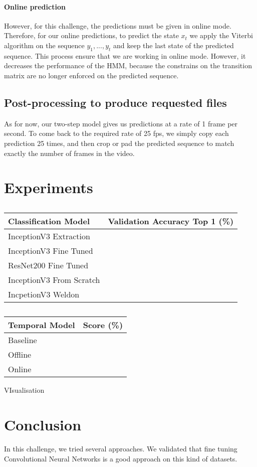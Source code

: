 \documentclass[10pt,twocolumn,letterpaper]{article}
\begin{document}
\paragraph{Online prediction} However, for this challenge, the predictions must
be given in online mode. Therefore, for our online predictions, to predict the state
$x_t$ we apply the Viterbi algorithm on the sequence $y_1,...,y_t$ and keep the
last state of the predicted sequence. This process ensure that we are working in online
mode. However, it decreases the performance of the HMM, because the constrains on the transition
matrix are no longer enforced on the predicted sequence.

\subsection{Post-processing to produce requested files}

As for now, our two-step model gives us predictions at a rate of 1 frame per second. To come
back to the required rate of 25 fps, we simply copy each prediction 25 times, and
then crop or pad the predicted sequence to match exactly the number of frames in
the video.

\section{Experiments}


\begin{table}
	\begin{center}
		\begin{tabular}{|l|c|}
			\hline
			Classification Model & Validation Accuracy Top 1 (\%) \\
			\hline\hline
			InceptionV3 Extraction &  \\
			InceptionV3 Fine Tuned &  \\
			ResNet200 Fine Tuned & \\
			InceptionV3 From Scratch & \\
			IncpetionV3 Weldon & \\
			\hline
		\end{tabular}
	\end{center}
	\caption{}
\end{table}


\begin{table}
	\begin{center}
		\begin{tabular}{|l|c|}
			\hline
			Temporal Model & Score (\%) \\
			\hline\hline
			Baseline &  \\
			Offline &  \\
			Online & \\
			\hline
		\end{tabular}
	\end{center}
	\caption{}
\end{table}


VIsualisation



\section{Conclusion}

In this challenge, we tried several approaches. We validated that fine tuning Convolutional Neural Networks is a good approach on this kind of datasets.






{\small


}
\end{document}
